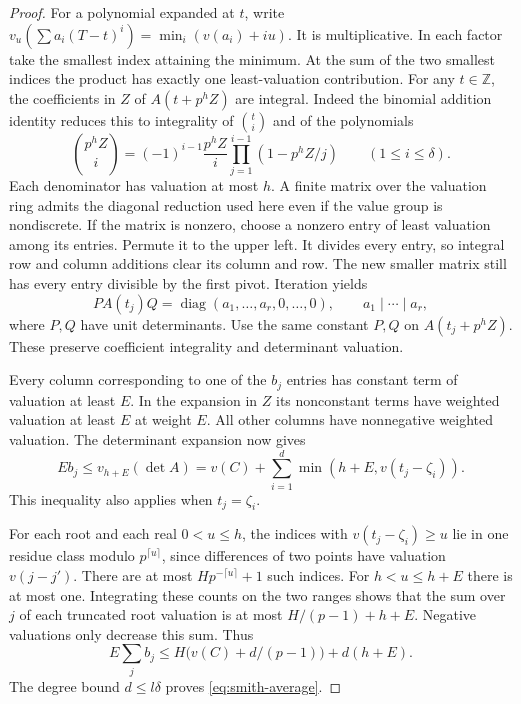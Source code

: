 \begin{proof}
For a polynomial expanded at \(t\), write
\(v_u(\sum a_i(T-t)^i)=\min_i(v(a_i)+iu)\).
It is multiplicative. In each factor take the smallest index
attaining the minimum. At the sum of the two smallest indices
the product has exactly one least-valuation contribution.
For any \(t\in\mathbb Z\), the coefficients in \(Z\) of
\(A(t+p^hZ)\) are integral. Indeed the binomial addition
identity reduces this to integrality of \(\binom ti\) and
of the polynomials
\[
 \binom{p^hZ}{i}
 =(-1)^{i-1}\frac{p^hZ}{i}
                \prod_{j=1}^{i-1}(1-p^hZ/j)
                  \qquad(1\le i\le\delta).
\]
Each denominator has valuation at most \(h\).
A finite matrix over the valuation ring admits the diagonal reduction used here even if the value group is nondiscrete. If the matrix is nonzero, choose a nonzero entry of least valuation among its entries. Permute it to the upper left. It divides every entry, so integral row and column additions clear its column and row. The new smaller matrix still has every entry divisible by the first pivot. Iteration yields
\[
  P A(t_j)Q=\operatorname{diag}(a_1,\ldots,a_r,0,\ldots,0),
  \qquad a_1\mid\cdots\mid a_r ,
\]
where \(P,Q\) have unit determinants. Use the same constant \(P,Q\) on \(A(t_j+p^hZ)\).
These preserve coefficient integrality and determinant valuation.


Every column corresponding to one of the \(b_j\) entries has
constant term of valuation at least \(E\). In the expansion in
\(Z\) its nonconstant terms have weighted valuation at least
\(E\) at weight \(E\). All other columns have nonnegative
weighted valuation. The determinant expansion now gives
\[
 E b_j \le v_{h+E}(\det A)
       =v(C)+\sum_{i=1}^d\min(h+E,v(t_j-\zeta_i)).
\]
This inequality also applies when \(t_j=\zeta_i\).

For each root and each real \(0<u\le h\), the indices with
\(v(t_j-\zeta_i)\ge u\) lie in one residue class modulo
\(p^{\lceil u\rceil}\), since differences of two points have
valuation \(v(j-j')\). There are at most
\(Hp^{-\lceil u\rceil}+1\) such indices. For \(h<u\le h+E\)
there is at most one. Integrating these counts on the two
ranges shows that the sum over \(j\) of each truncated root
valuation is at most \(H/(p-1)+h+E\). Negative valuations only
decrease this sum. Thus
\[
 E\sum_j b_j\le
 H\big(v(C)+d/(p-1)\big)+d(h+E).
\]
The degree bound \(d\le l\delta\) proves
\eqref{eq:smith-average}.
\end{proof}

